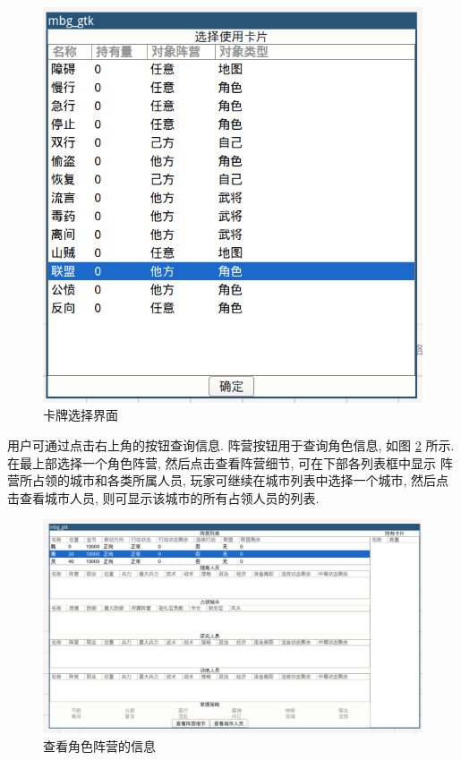 \documentclass[UTF8, zihao=-4]{ctexart} %
\begin{document}
\begin{figure}
    \centering
    \includegraphics[width=\textwidth]{f_cards.png}
    \caption{\label{f_cards}卡牌选择界面}
\end{figure}

用户可通过点击右上角的按钮查询信息. 
阵营按钮用于查询角色信息, 如图 \ref{f_role} 所示. 
在最上部选择一个角色阵营, 然后点击查看阵营细节, 可在下部各列表框中显示
阵营所占领的城市和各类所属人员, 玩家可继续在城市列表中选择一个城市,
然后点击查看城市人员, 则可显示该城市的所有占领人员的列表.
\begin{figure}
    \centering
    \includegraphics[width=\textwidth]{f_role.png}
    \caption{\label{f_role}查看角色阵营的信息}
\end{figure}
\end{document}

